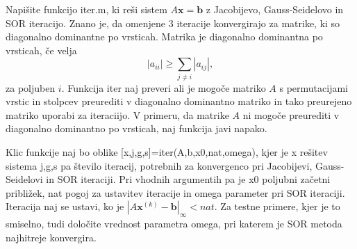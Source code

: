 \documentclass{article}
\begin{document}
Napišite funkcijo iter.m, ki reši sistem \(A\mathbf{x}=\mathbf{b}\) z Jacobijevo, Gauss-Seidelovo in SOR iteracijo.  Znano je, da omenjene 3 iteracije konvergirajo za matrike, ki so diagonalno dominantne po vrsticah. Matrika je diagonalno dominantna po vrsticah, če velja \[|a_{ii}|\ge\sum_{j\not=i}|a_{ij}|,\] za poljuben \(i\). Funkcija iter naj preveri ali je mogoče matriko \(A\) s permutacijami vrstic in stolpcev preurediti v diagonalno dominantno matriko in tako preurejeno matriko uporabi za iteraciijo. V primeru, da matrike \(A\) ni mogoče preurediti v diagonalno dominantno po vrsticah, naj funkcija javi napako.

Klic funkcije naj bo oblike [x,j,g,s]=iter(A,b,x0,nat,omega), kjer je x rešitev sistema j,g,s pa število iteracij, potrebnih za konvergenco pri Jacobijevi, Gauss-Seidelovi in SOR iteraciji. Pri vhodnih argumentih pa je x0 poljubni začetni približek, nat pogoj za ustavitev iteracije in omega parameter pri SOR iteraciji. Iteracija naj se ustavi, ko je \(|A\mathbf{x}^{(k)}-\mathbf{b}|_\infty < nat\). Za testne primere, kjer je to smiselno, tudi določite vrednost parametra omega, pri katerem je SOR metoda najhitreje konvergira.
\end{document}
